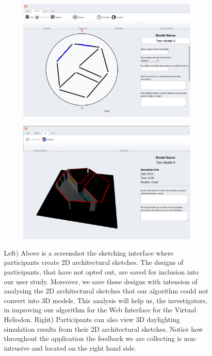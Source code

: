 \documentclass[12pt]{article}
\begin{document}
\begin{figure}[h]
  \begin{subfigure}{.5\textwidth}
    \centering
    \includegraphics[scale=0.2]{ss_sketch}
  \end{subfigure}%
  \begin{subfigure}{.5\textwidth}
    \centering
    \includegraphics[scale=0.2]{ss_render}
  \end{subfigure}
\caption{Left) Above is a screenshot the sketching interface where participants create 2D architectural sketches. The designs of participants, that have not opted out, are saved for inclusion into our user study. Moreover, we save these designs with intension of analysing the 2D architectural sketches that our algorithm could not convert into 3D models. This analysis will help us, the investigators, in improving our algorithm for the Web Interface for the Virtual Heliodon.
Right) Participants can also view 3D daylighting simulation results from their 2D architectural sketches. Notice how throughout the application the feedback we are collecting is non-intrusive and located on the right hand side. }
\end{figure}
\end{document}
